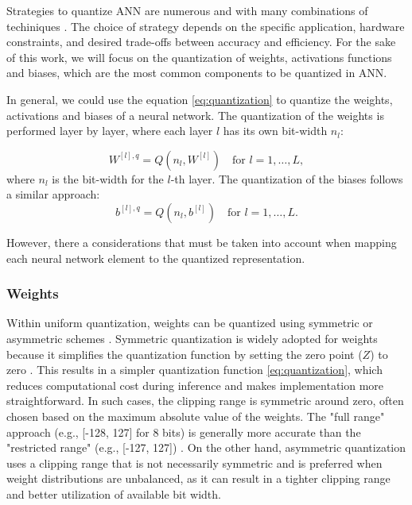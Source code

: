 Strategies to quantize ANN are numerous and with many combinations of techiniques \cite{jacob2018quantization, Zhu2020Survey}. The choice of strategy depends on the specific application, hardware constraints, and desired trade-offs between accuracy and efficiency. For the sake of this work, we will focus on the quantization of weights, activations functions and biases, which are the most common components to be quantized in ANN.

In general, we could use the equation \ref{eq:quantization} to quantize the weights, activations and biases of a neural network. The quantization of the weights is performed layer by layer, where each layer $l$ has its own bit-width $n_l$:

\begin{equation}
W^{[l],q} = Q(n_l, W^{[l]}) \quad \text{for } l = 1, \dots, L,
\end{equation}
where $n_l$ is the bit-width for the $l$-th layer. The quantization of the biases follows a similar approach:
\begin{equation}
b^{[l],q} = Q(n_l, b^{[l]}) \quad \text{for } l = 1, \dots, L.
\end{equation}

However, there a considerations that must be taken into account when mapping each neural network element to the quantized representation. 

\subsubsection*{Weights}

Within uniform quantization, weights can be quantized using symmetric or asymmetric schemes \cite{Zhu2020Survey}. Symmetric quantization is widely adopted for weights because it simplifies the quantization function by setting the zero point ($Z$) to zero \cite{Zhu2020Survey}. This results in a simpler quantization function \ref{eq:quantization}, which reduces computational cost during inference and makes implementation more straightforward. In such cases, the clipping range is symmetric around zero, often chosen based on the maximum absolute value of the weights. The "full range" approach (e.g., [-128, 127] for 8 bits) is generally more accurate than the "restricted range" (e.g., [-127, 127]) \cite{Zhu2020Survey}. On the other hand, asymmetric quantization uses a clipping range that is not necessarily symmetric and is preferred when weight distributions are unbalanced, as it can result in a tighter clipping range and better utilization of available bit width.

